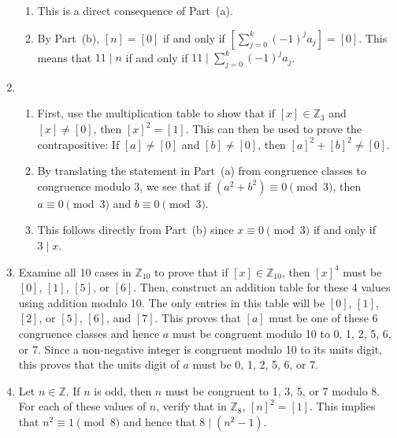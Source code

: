 \begin{enumerate}
\begin{enumerate}
\item This is a direct consequence of Part~(a).

\item By Part~(b), $\left[ n \right] = \left[ 0 \right]$ if and only if 
$\left[ {\sum\limits_{j = 0}^k {\left( { - 1} \right)^j a_j } }\right] = \left[ 0 \right]$.  This means that  $11 \mid n$ if and only if  
$11 \mid \sum\limits_{j = 0}^k {\left( { - 1} \right)^j a_j }$. 
\end{enumerate}

\item \begin{enumerate}
\item First, use the multiplication table to show that if $\left[ x \right] \in \mathbb{Z}_3$ and 
$\left[ x \right] \ne \left[ 0 \right]$, then $\left[ x \right]^2 = \left[ 1 \right]$.  This can then be used to prove the contrapositive: If $\left[ a \right] \ne \left[ 0 \right]$ and 
$\left[ b \right] \ne \left[ 0 \right]$, then 
$\left[ a \right]^2 + \left[ b \right]^2 \ne \left[ 0 \right]$.

\item By translating the statement in Part~(a) from congruence classes to congruence modulo 3, we see that if  $\left( {a^2  + b^2 } \right) \equiv 0 \pmod 3$, then  
$a \equiv 0 \pmod 3$  and  $b \equiv 0 \pmod 3$.

\item This follows directly from Part~(b) since $x \equiv 0 \pmod 3$ if and only if $3 \mid x$.
\end{enumerate}

\item Examine all 10 cases in $\mathbb{Z}_{10}$ to prove that if 
$\left[ x \right] \in \mathbb{Z}_{10}$, then $\left[ x \right]^4$ must be $\left[ 0 \right]$, 
$\left[ 1 \right]$, $\left[ 5 \right]$, or $\left[ 6 \right]$.  Then, construct an addition table for these 4 values using addition modulo 10.  The only entries in this table will be 
$\left[ 0 \right]$, $\left[ 1 \right]$, $\left[ 2 \right]$, or $\left[ 5 \right]$, 
$\left[ 6 \right]$, and $\left[ 7 \right]$.  This proves that $\left [ a \right]$ must be one of these 6 congruence classes and hence $a$ must be congruent modulo 10 to 0, 1, 2, 5, 6, or 7.  Since a non-negative integer is congruent modulo 10 to its units digit, this proves that the units digit of $a$ must be 0, 1, 2, 5, 6, or 7.


\item Let $n \in \mathbb{Z}$.  If $n$ is odd, then $n$ must be congruent to 1, 3, 5, or 7 modulo 8.  For each of these values of $n$, verify that in 
$\mathbb{Z}_8$, $\left[ n \right]^2 = \left[ 1 \right]$.  This implies that 
$n^2 \equiv 1 \pmod 8$ and hence that $8 \mid \left( n^2 - 1 \right)$.


\end{enumerate}
